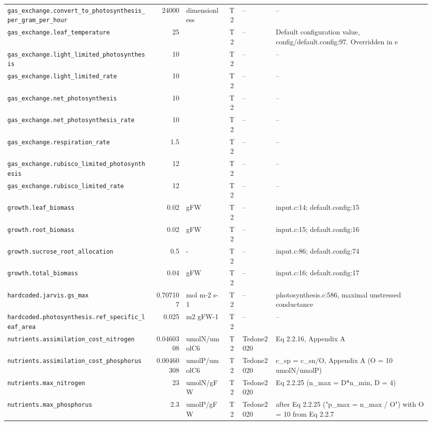 \begin{table}[!htbp]
\begin{tabular}{@{}p{52mm}rp{20mm}cp{20mm}p{38mm}@{}}
\texttt{gas\_exchange.convert\_to\_photosynthesis\_per\_gram\_per\_hour} & 24000 & dimensionless & T2 & -- & -- \\
\texttt{gas\_exchange.leaf\_temperature} & 25 &  & T2 & -- & Default configuration value, config/default.config:97. Overridden in e \\
\texttt{gas\_exchange.light\_limited\_photosynthesis} & 10 &  & T2 & -- & -- \\
\texttt{gas\_exchange.light\_limited\_rate} & 10 &  & T2 & -- & -- \\
\texttt{gas\_exchange.net\_photosynthesis} & 10 &  & T2 & -- & -- \\
\texttt{gas\_exchange.net\_photosynthesis\_rate} & 10 &  & T2 & -- & -- \\
\texttt{gas\_exchange.respiration\_rate} & 1.5 &  & T2 & -- & -- \\
\texttt{gas\_exchange.rubisco\_limited\_photosynthesis} & 12 &  & T2 & -- & -- \\
\texttt{gas\_exchange.rubisco\_limited\_rate} & 12 &  & T2 & -- & -- \\
\texttt{growth.leaf\_biomass} & 0.02 & gFW & T2 & -- & input.c:14; default.config:15 \\
\texttt{growth.root\_biomass} & 0.02 & gFW & T2 & -- & input.c:15; default.config:16 \\
\texttt{growth.sucrose\_root\_allocation} & 0.5 & - & T2 & -- & input.c:86; default.config:74 \\
\texttt{growth.total\_biomass} & 0.04 & gFW & T2 & -- & input.c:16; default.config:17 \\
\texttt{hardcoded.jarvis.gs\_max} & 0.707107 & mol m-2 s-1 & T2 & -- & photosynthesis.c:586, maximal unstressed conductance \\
\texttt{hardcoded.photosynthesis.ref\_specific\_leaf\_area} & 0.025 & m2 gFW-1 & T2 & -- & -- \\
\texttt{nutrients.assimilation\_cost\_nitrogen} & 0.0460308 & umolN/umolC6 & T2 & Tedone2020 & Eq 2.2.16, Appendix A \\
\texttt{nutrients.assimilation\_cost\_phosphorus} & 0.00460308 & umolP/umolC6 & T2 & Tedone2020 & c\_sp = c\_sn/O, Appendix A (O = 10 umolN/umolP) \\
\texttt{nutrients.max\_nitrogen} & 23 & umolN/gFW & T2 & Tedone2020 & Eq 2.2.25 (n\_max = D*n\_min, D = 4) \\
\texttt{nutrients.max\_phosphorus} & 2.3 & umolP/gFW & T2 & Tedone2020 & after Eq 2.2.25 ("p\_max = n\_max / O") with O = 10 from Eq 2.2.7 \\

\end{tabular}
\end{table}
